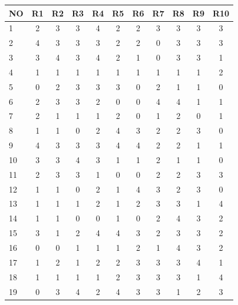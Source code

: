 \documentclass[
 manuscript=article,  %
  layout=publish, 
  year=2024, 
  month= Februari, %
  volume=8,
  number=1 
]{JIKO}
\begin{document}
\begin{table}[hbt!]
    \begin{threeparttable}
        \begin{tabular}{l*{10}{c}}
            \toprule
            \textbf{NO} & \textbf{R1} & \textbf{R2} & \textbf{R3} & \textbf{R4} & \textbf{R5} & \textbf{R6} & \textbf{R7} & \textbf{R8} & \textbf{R9} & \textbf{R10} \\
            \midrule
            1  & 2 & 3 & 3 & 4 & 2 & 2 & 3 & 3 & 3 & 3 \\
            \hline
            2  & 4 & 3 & 3 & 3 & 2 & 2 & 0 & 3 & 3 & 3 \\
            \hline
            3  & 3 & 4 & 3 & 4 & 2 & 1 & 0 & 3 & 3 & 1 \\
            \hline
            4  & 1 & 1 & 1 & 1 & 1 & 1 & 1 & 1 & 1 & 2 \\
            \hline
            5  & 0 & 2 & 3 & 3 & 3 & 0 & 2 & 1 & 1 & 0 \\
            \hline
            6  & 2 & 3 & 3 & 2 & 0 & 0 & 4 & 4 & 1 & 1 \\
            \hline
            7  & 2 & 1 & 1 & 1 & 2 & 0 & 1 & 2 & 0 & 1 \\
            \hline
            8  & 1 & 1 & 0 & 2 & 4 & 3 & 2 & 2 & 3 & 0 \\
            \hline
            9  & 4 & 3 & 3 & 3 & 4 & 4 & 2 & 2 & 1 & 1 \\
            \hline
            10 & 3 & 3 & 4 & 3 & 1 & 1 & 2 & 1 & 1 & 0 \\
            \hline
            11 & 2 & 3 & 3 & 1 & 0 & 0 & 2 & 2 & 3 & 3 \\
            \hline
            12 & 1 & 1 & 0 & 2 & 1 & 4 & 3 & 2 & 3 & 0 \\
            \hline
            13 & 1 & 1 & 1 & 2 & 1 & 2 & 3 & 3 & 1 & 4 \\
            \hline
            14 & 1 & 1 & 0 & 0 & 1 & 0 & 2 & 4 & 3 & 2 \\
            \hline
            15 & 3 & 1 & 2 & 4 & 4 & 3 & 2 & 3 & 3 & 2 \\
            \hline
            16 & 0 & 0 & 1 & 1 & 1 & 2 & 1 & 4 & 3 & 2 \\
            \hline
            17 & 1 & 2 & 1 & 2 & 2 & 3 & 3 & 3 & 4 & 1 \\
            \hline
            18 & 1 & 1 & 1 & 1 & 2 & 3 & 3 & 3 & 1 & 4 \\
            \hline
            19 & 0 & 3 & 4 & 2 & 4 & 3 & 3 & 1 & 2 & 3 \\

\end{tabular}
\end{threeparttable}
\end{table}
\end{document}
